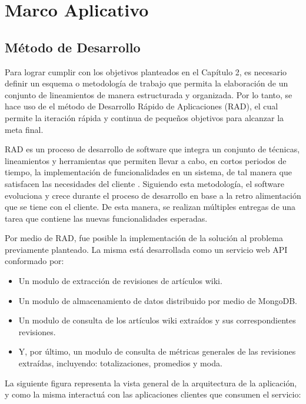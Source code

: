 \section{Marco Aplicativo}

\subsection{Método de Desarrollo}

Para lograr cumplir con los objetivos planteados en el Capítulo 2, es necesario definir un
esquema o metodología de trabajo que permita la elaboración de un conjunto de
lineamientos de manera estructurada y organizada. Por lo tanto, se hace uso de el método de
Desarrollo Rápido de Aplicaciones (RAD), el cual permite la iteración rápida y continua
de pequeños objetivos para alcanzar la meta final.

RAD es un proceso de desarrollo de software que
integra un conjunto de técnicas, lineamientos y herramientas que permiten llevar a cabo, en
cortos periodos de tiempo, la implementación de funcionalidades en un sistema, de tal manera que
satisfacen las necesidades del cliente \cite{23}. Siguiendo esta metodología, el software
evoluciona y crece durante el proceso de desarrollo en base a la retro alimentación que
se tiene con el cliente. De esta manera, se realizan múltiples entregas de una tarea que
contiene las nuevas funcionalidades esperadas.

Por medio de RAD, fue posible la implementación de la solución al problema previamente planteado.
La misma está desarrollada como un servicio web API conformado por:

\begin{itemize}

\item Un modulo de extracción de revisiones de artículos wiki.

\item Un modulo de almacenamiento de datos distribuido por medio de MongoDB.

\item Un modulo de consulta de los artículos wiki extraídos y sus correspondientes revisiones.

\item Y, por último, un modulo de consulta de métricas generales de las revisiones extraídas, incluyendo: totalizaciones, promedios y moda.

\end{itemize}

La siguiente figura representa la vista general de la arquitectura de la aplicación, y como la misma interactuá con
las aplicaciones clientes que consumen el servicio:

